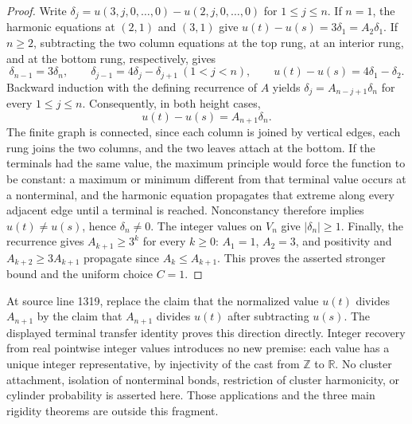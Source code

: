 \documentclass[11pt]{article}
\begin{document}
\begin{proof}
Write $\delta_j=u(3,j,0,\ldots,0)-u(2,j,0,\ldots,0)$ for
$1\leq j\leq n$. If $n=1$, the harmonic equations at $(2,1)$ and
$(3,1)$ give $u(t)-u(s)=3\delta_1=A_2\delta_1$.
If $n\geq2$, subtracting the two column equations at the top rung,
at an interior rung, and at the bottom rung, respectively, gives
\[
\delta_{n-1}=3\delta_n,\qquad
\delta_{j-1}=4\delta_j-\delta_{j+1}\ (1<j<n),\qquad
u(t)-u(s)=4\delta_1-\delta_2.
\]
Backward induction with the defining recurrence of $A$ yields
$\delta_j=A_{n-j+1}\delta_n$ for every $1\leq j\leq n$.
Consequently, in both height cases,
\[
 u(t)-u(s)=A_{n+1}\delta_n.
\]
The finite graph is connected, since each column is joined by vertical edges,
each rung joins the two columns, and the two leaves attach at the bottom.
If the terminals had the same value, the maximum principle would force the
function to be constant: a maximum or minimum different from that terminal
value occurs at a nonterminal, and the harmonic equation propagates that
extreme along every adjacent edge until a terminal is reached.
Nonconstancy therefore implies $u(t)\ne u(s)$, hence $\delta_n\ne0$.
The integer values on $V_n$ give $|\delta_n|\geq1$.
Finally, the recurrence gives $A_{k+1}\geq3^k$ for every $k\geq0$:
$A_1=1$, $A_2=3$, and positivity and
$A_{k+2}\geq3A_{k+1}$ propagate since $A_k\leq A_{k+1}$.
This proves the asserted stronger bound and the uniform choice $C=1$.
\end{proof}

At source line 1319, replace the claim that the normalized value $u(t)$
divides $A_{n+1}$ by the claim that $A_{n+1}$ divides $u(t)$ after
subtracting $u(s)$. The displayed terminal transfer identity proves this
direction directly. Integer recovery from real pointwise integer values
introduces no new premise: each value has a unique integer representative,
by injectivity of the cast from $\mathbb Z$ to $\mathbb R$.
No cluster attachment, isolation of nonterminal bonds, restriction of
cluster harmonicity, or cylinder probability is asserted here. Those
applications and the three main rigidity theorems are outside this fragment.
\end{document}
